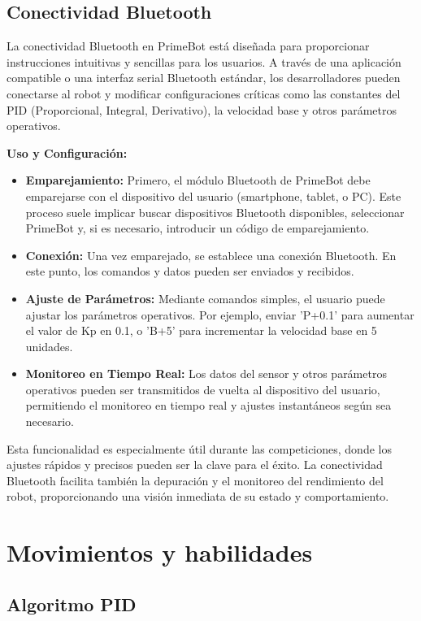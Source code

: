 \subsection{Conectividad Bluetooth}
La conectividad Bluetooth en PrimeBot está diseñada para proporcionar instrucciones intuitivas y sencillas para los usuarios. A través de una aplicación compatible o una interfaz serial Bluetooth estándar, los desarrolladores pueden conectarse al robot y modificar configuraciones críticas como las constantes del PID (Proporcional, Integral, Derivativo), la velocidad base y otros parámetros operativos.

\textbf{Uso y Configuración:}
\begin{itemize}
	\item \textbf{Emparejamiento:} Primero, el módulo Bluetooth de PrimeBot debe emparejarse con el dispositivo del usuario (smartphone, tablet, o PC). Este proceso suele implicar buscar dispositivos Bluetooth disponibles, seleccionar PrimeBot y, si es necesario, introducir un código de emparejamiento.
	\item \textbf{Conexión:} Una vez emparejado, se establece una conexión Bluetooth. En este punto, los comandos y datos pueden ser enviados y recibidos.
	\item \textbf{Ajuste de Parámetros:} Mediante comandos simples, el usuario puede ajustar los parámetros operativos. Por ejemplo, enviar 'P+0.1' para aumentar el valor de Kp en 0.1, o 'B+5' para incrementar la velocidad base en 5 unidades.
	\item \textbf{Monitoreo en Tiempo Real:} Los datos del sensor y otros parámetros operativos pueden ser transmitidos de vuelta al dispositivo del usuario, permitiendo el monitoreo en tiempo real y ajustes instantáneos según sea necesario.
\end{itemize}
Esta funcionalidad es especialmente útil durante las competiciones, donde los ajustes rápidos y precisos pueden ser la clave para el éxito. La conectividad Bluetooth facilita también la depuración y el monitoreo del rendimiento del robot, proporcionando una visión inmediata de su estado y comportamiento.


\section{Movimientos y habilidades}\label{movimientos}

\subsection{Algoritmo PID}\label{algoritmo-pid}

